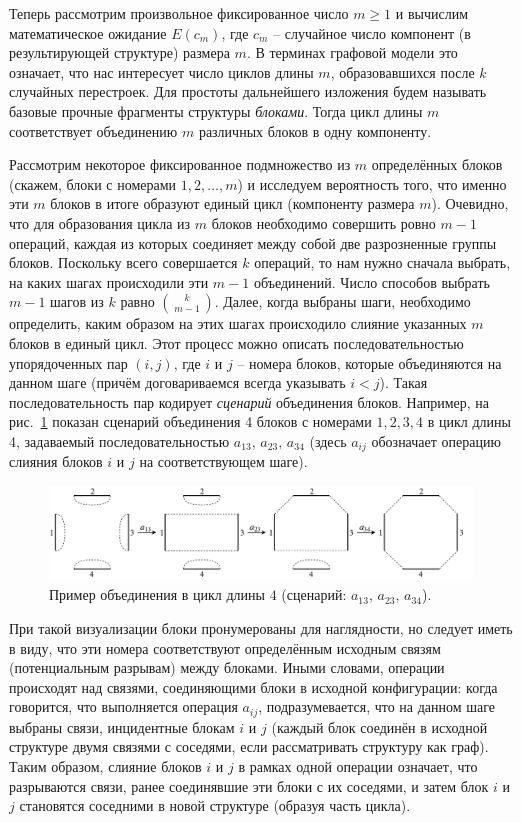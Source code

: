Теперь рассмотрим произвольное фиксированное число $m \ge 1$ и вычислим математическое ожидание $E(c_m)$, где $c_m$ -- случайное число компонент (в результирующей структуре) размера $m$. В терминах графовой модели это означает, что нас интересует число циклов длины $m$, образовавшихся после $k$ случайных перестроек. Для простоты дальнейшего изложения будем называть базовые прочные фрагменты структуры \emph{блоками}. Тогда цикл длины $m$ соответствует объединению $m$ различных блоков в одну компоненту.

Рассмотрим некоторое фиксированное подмножество из $m$ определённых блоков (скажем, блоки с номерами $1,2,\dots,m$) и исследуем вероятность того, что именно эти $m$ блоков в итоге образуют единый цикл (компоненту размера $m$). Очевидно, что для образования цикла из $m$ блоков необходимо совершить ровно $m-1$ операций, каждая из которых соединяет между собой две разрозненные группы блоков. Поскольку всего совершается $k$ операций, то нам нужно сначала выбрать, на каких шагах происходили эти $m-1$ объединений. Число способов выбрать $m-1$ шагов из $k$ равно $\binom{k}{\,m-1\,}$. Далее, когда выбраны шаги, необходимо определить, каким образом на этих шагах происходило слияние указанных $m$ блоков в единый цикл. Этот процесс можно описать последовательностью упорядоченных пар $(i,j)$, где $i$ и $j$ -- номера блоков, которые объединяются на данном шаге (причём договариваемся всегда указывать $i<j$). Такая последовательность пар кодирует \emph{сценарий} объединения блоков. Например, на рис.~\ref{merge-into-cycle} показан сценарий объединения 4 блоков с номерами $1,2,3,4$ в цикл длины 4, задаваемый последовательностью $a_{13},\,a_{23},\,a_{34}$ (здесь $a_{ij}$ обозначает операцию слияния блоков $i$ и $j$ на соответствующем шаге). 

\begin{figure}[h!]
    \centering
    \includegraphics[width=\linewidth]{images/part2/merge-into-cycle.pdf}
    \caption{Пример объединения в цикл длины $4$ (сценарий: $a_{13},\,a_{23},\,a_{34}$).}
    \label{merge-into-cycle}
\end{figure}

При такой визуализации блоки пронумерованы для наглядности, но следует иметь в виду, что эти номера соответствуют определённым исходным связям (потенциальным разрывам) между блоками. Иными словами, операции происходят над связями, соединяющими блоки в исходной конфигурации: когда говорится, что выполняется операция $a_{ij}$, подразумевается, что на данном шаге выбраны связи, инцидентные блокам $i$ и $j$ (каждый блок соединён в исходной структуре двумя связями с соседями, если рассматривать структуру как граф). Таким образом, слияние блоков $i$ и $j$ в рамках одной операции означает, что разрываются связи, ранее соединявшие эти блоки с их соседями, и затем блок $i$ и $j$ становятся соседними в новой структуре (образуя часть цикла).

